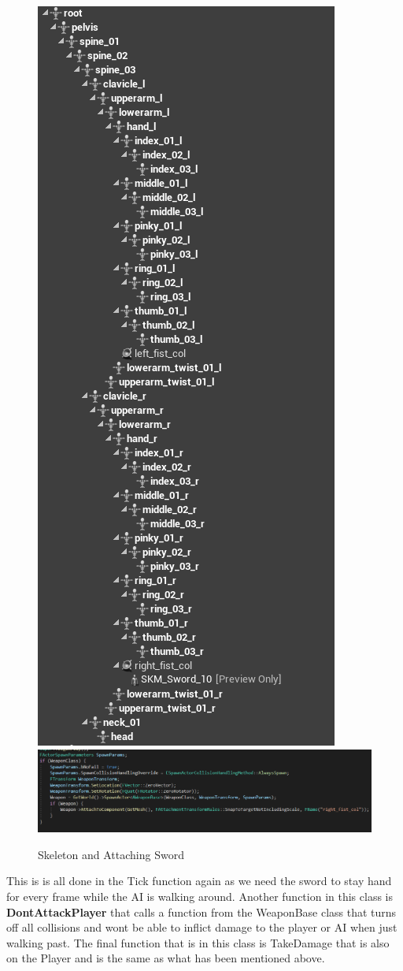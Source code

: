 \begin{figure}[H]
    \centering
    \includegraphics[scale=.3]{img/Skeleton.PNG}
    \includegraphics[scale=.3]{img/AIAttachSword.PNG}
    \caption{Skeleton and Attaching Sword}
    \label{Skeleton}
\end{figure}
This is is all done in the Tick function again as we need the sword to stay hand for every frame while the AI is walking around. Another function in this class is \textbf{DontAttackPlayer} that calls a function from the WeaponBase class that turns off all collisions and wont be able to inflict damage to the player or AI when just walking past. The final function that is in this class is TakeDamage that is also on the Player and is the same as what has been mentioned above.
